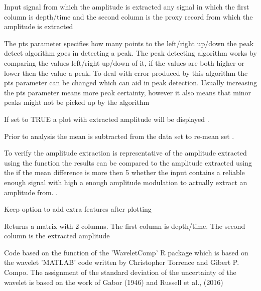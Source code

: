 \documentclass[a4paper]{book}
\begin{document}
%
\begin{Arguments}
\begin{ldescription}
\item[\code{signal}] Input signal from which the amplitude is extracted any signal in which the first column is
depth/time and the second column is the proxy record from which the amplitude is extracted

\item[\code{pts}] The pts parameter specifies how many points to the left/right up/down the peak detect algorithm goes in detecting
a peak. The peak detecting algorithm works by comparing the values left/right up/down of it, if the values are both higher or lower
then the value a peak. To deal with error produced by this algorithm the pts parameter can be changed which can
aid in peak detection. Usually increasing the pts parameter means more peak certainty, however it also means that minor peaks might not be
picked up by the algorithm 

\item[\code{genplot}] If set to TRUE a plot with extracted amplitude will be displayed .

\item[\code{remean}] Prior to analysis the mean is subtracted from the data set to re-mean set .

\item[\code{ver\_results}] To verify the amplitude extraction is representative of the amplitude
extracted using the  function the results can be compared to the amplitude extracted
using the  if the mean difference is more then 5
whether the input contains a reliable enough signal with high a enough amplitude modulation to actually extract an amplitude from. .

\item[\code{keep\_editable}] Keep option to add extra features after plotting  
\end{ldescription}
\end{Arguments}
%
\begin{Value}
Returns a matrix with 2 columns.
The first column is depth/time.
The second column is the extracted amplitude
\end{Value}
%
\begin{Author}
Code based on the  function of the 'WaveletComp' R package
which is based on the wavelet 'MATLAB' code written by Christopher Torrence and Gibert P. Compo.
The assignment of the standard deviation of the uncertainty of the wavelet
is based on the work of Gabor (1946) and Russell et al., (2016)
\end{Author}
\end{document}
